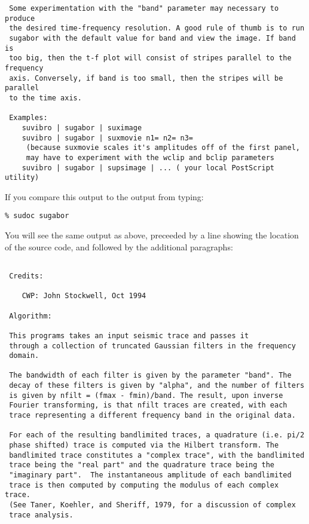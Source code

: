 {{{\begin{verbatim}
 Some experimentation with the "band" parameter may necessary to produce
 the desired time-frequency resolution. A good rule of thumb is to run 
 sugabor with the default value for band and view the image. If band is
 too big, then the t-f plot will consist of stripes parallel to the frequency
 axis. Conversely, if band is too small, then the stripes will be parallel
 to the time axis.                                                      
                                                                        
 Examples:                                                              
    suvibro | sugabor | suximage                                        
    suvibro | sugabor | suxmovie n1= n2= n3=                            
     (because suxmovie scales it's amplitudes off of the first panel,  
     may have to experiment with the wclip and bclip parameters        
    suvibro | sugabor | supsimage | ... ( your local PostScript utility)

\end{verbatim}} \noindent

If you compare this output to the output from typing:

{\small \begin{verbatim}
% sudoc sugabor 
\end{verbatim}}\noindent

You will see the same output as above, preceeded by
a line showing the location of the source code,
and followed by the additional paragraphs: 
{\small \begin{verbatim}

 Credits:

	CWP: John Stockwell, Oct 1994

 Algorithm:

 This programs takes an input seismic trace and passes it
 through a collection of truncated Gaussian filters in the frequency
 domain.

 The bandwidth of each filter is given by the parameter "band". The
 decay of these filters is given by "alpha", and the number of filters
 is given by nfilt = (fmax - fmin)/band. The result, upon inverse
 Fourier transforming, is that nfilt traces are created, with each
 trace representing a different frequency band in the original data.

 For each of the resulting bandlimited traces, a quadrature (i.e. pi/2
 phase shifted) trace is computed via the Hilbert transform. The 
 bandlimited trace constitutes a "complex trace", with the bandlimited
 trace being the "real part" and the quadrature trace being the 
 "imaginary part".  The instantaneous amplitude of each bandlimited
 trace is then computed by computing the modulus of each complex trace.
 (See Taner, Koehler, and Sheriff, 1979, for a discussion of complex
 trace analysis.


\end{verbatim}}}}
